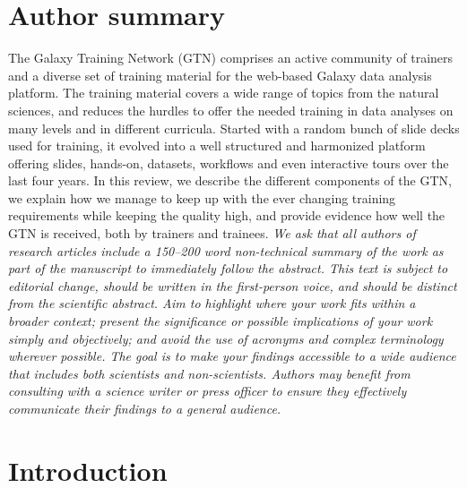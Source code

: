 \documentclass[10pt,letterpaper]{article}
\begin{document}
\section*{Author summary}
The Galaxy Training Network (GTN) comprises an active community of trainers and a diverse set of training material for the web-based Galaxy data analysis platform. The training material covers a wide range of topics from the natural sciences, and reduces the hurdles to offer the needed training in data analyses on many levels and in different curricula. Started with a random bunch of slide decks used for training, it evolved into a well structured and harmonized platform offering slides, hands-on, datasets, workflows and even interactive tours over the last four years. 
In this review, we describe the different components of the GTN, we explain how we manage to keep up with the ever changing training requirements while keeping the quality high, and provide evidence how well the GTN is received, both by trainers and trainees. 
\emph{We ask that all authors of research articles include a 150–200 word non-technical summary of the work as part of the manuscript to immediately follow the abstract.
This text is subject to editorial change, should be written in the first-person voice, and should be distinct from the scientific abstract.
Aim to highlight where your work fits within a broader context; present the significance or possible implications of your work simply and objectively; and avoid the use of acronyms and complex terminology wherever possible.
The goal is to make your findings accessible to a wide audience that includes both scientists and non-scientists.
Authors may benefit from consulting with a science writer or press officer to ensure they effectively communicate their findings to a general audience.}



\section*{Introduction}
\end{document}

